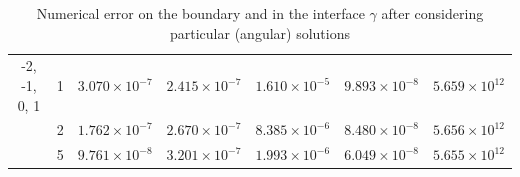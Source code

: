 \begin{table}[htbp]
\begin{longtable}{ccccccc}
        -2, -1, 0, 1 & 1 & $3.070\times10^{-7}$ & $2.415\times10^{-7}$ & $1.610\times10^{-5}$ & $9.893\times10^{-8}$ & $5.659\times10^{12}$ \\
        & 2 & $1.762\times10^{-7}$ & $2.670\times10^{-7}$ & $8.385\times10^{-6}$ & $8.480\times10^{-8}$ & $5.656\times10^{12}$ \\
        & 5 & $9.761\times10^{-8}$ & $3.201\times10^{-7}$ & $1.993\times10^{-6}$ & $6.049\times10^{-8}$ & $5.655\times10^{12}$ \\
        \midrule[\heavyrulewidth] %
    \end{longtable}
    \caption{Numerical error on the boundary and in the interface \(\gamma\) after considering particular (angular) solutions}
    \label{tab:transmission_results_L_shape_axis_particular}
\end{table}

        
